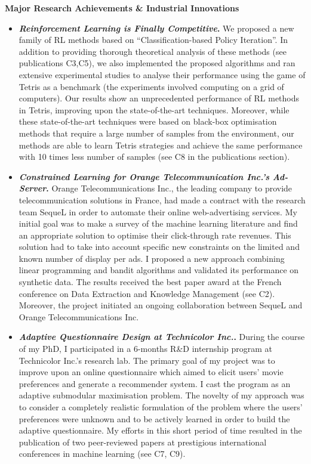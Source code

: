 \noindent 
\textbf{Major Research Achievements \& Industrial Innovations}
\\[-.4cm]\noindent\makebox[\linewidth]{\rule{\columnwidth}{0.4pt}}
\begin{itemize}
\item \textit{\textbf{Reinforcement Learning is Finally Competitive}}\textit{}\textbf{.} We proposed a new family of RL methods based on ``Classification-based Policy Iteration''. In addition to providing thorough theoretical analysis of these methods (see publications C3,C5), we also implemented the proposed algorithms and ran extensive experimental studies to analyse their performance using the game of Tetris as a benchmark (the experiments involved computing on a grid of computers). Our results show an unprecedented performance of RL methods in Tetris, improving upon the state-of-the-art techniques. Moreover, while these state-of-the-art techniques were based on black-box optimisation methods that require a large number of samples from the environment, our methods are able to learn Tetris strategies and achieve the same performance with 10 times less number of samples (see C8 in the publications section).
\item \textit{\textbf{Constrained Learning for Orange Telecommunication Inc.'s Ad-Server}}\textit{}\textbf{.}
Orange Telecommunications Inc., the leading company to provide telecommunication solutions in France, had made a contract with the research team SequeL in order to automate their online web-advertising services. My initial goal was to make a survey of the machine learning literature and find an appropriate solution to optimise their click-through rate revenues. This solution had to take into account specific new constraints on the limited and known number of display per ads. I proposed a new approach combining linear programming and bandit algorithms and validated its performance on synthetic data. The results received the best paper award at the French conference on Data Extraction and Knowledge Management (see C2). Moreover, the project initiated an ongoing collaboration between SequeL and Orange Telecommunications Inc.
\item \textit{\textbf{Adaptive Questionnaire Design at Technicolor Inc.}}\textit{}\textbf{.}
During the course of my PhD, I participated in a 6-months R\&D internship program at Technicolor Inc.'s research lab. The primary goal of my project was to improve upon an online questionnaire which aimed to elicit users' movie preferences and generate a recommender system. I cast the program as an adaptive submodular maximisation problem. 
The novelty of my approach was to consider a completely realistic formulation of the problem where the users' preferences were unknown and to be actively learned in order to build the adaptive questionnaire.  
My efforts in this short period of time resulted in the publication of two peer-reviewed papers at prestigious international conferences in machine learning (see C7, C9). 
\end{itemize}


